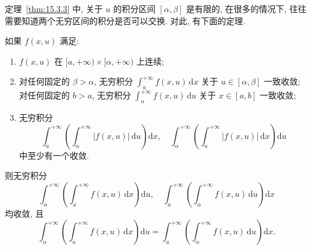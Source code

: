 定理~\ref{thm:15.3.3} 中, 关于 $u$ 的积分区间 $[\alpha,\beta]$ 是有限的, 在很多的情况下, 往往需要知道两个无穷区间的积分是否可以交换. 对此, 有下面的定理.

\begin{theorem}[无穷积分号与无穷积分号可交换]\label{thm:15.3.4}
如果 $f(x,u)$ 满足:
\begin{enumerate}
  \item $f(x,u)$ 在 $[a,+\infty)\times[\alpha,+\infty)$ 上连续;
  \item 对任何固定的 $\beta>\alpha$, 无穷积分 $\displaystyle\int_{a}^{+\infty}f(x,u)\,\mathrm{d}x$ 关于 $u\in[\alpha,\beta]$ 一致收敛; 对任何固定的 $b>a$, 无穷积分 $\displaystyle\int_{\alpha}^{+\infty}f(x,u)\,\mathrm{d}u$ 关于 $x\in[a,b]$ 一致收敛;
  \item 无穷积分
  \[
    \int_{a}^{+\infty}\left(\int_{\alpha}^{+\infty}|f(x,u)|\,\mathrm{d}u\right)\mathrm{d}x,\quad\int_{\alpha}^{+\infty}\left(\int_{a}^{+\infty}|f(x,u)|\,\mathrm{d}x\right)\mathrm{d}u
\]
  中至少有一个收敛.
\end{enumerate}
则无穷积分
\[
  \int_{\alpha}^{+\infty}\left(\int_{a}^{+\infty}f(x,u)\,\mathrm{d}x\right)\mathrm{d}u,\quad\int_{a}^{+\infty}\left(\int_{\alpha}^{+\infty}f(x,u)\,\mathrm{d}u\right)\mathrm{d}x
\]
均收敛, 且
\[
  \int_{\alpha}^{+\infty}\left(\int_{a}^{+\infty}f(x,u)\,\mathrm{d}x\right)\mathrm{d}u=\int_{a}^{+\infty}\left(\int_{\alpha}^{+\infty}f(x,u)\,\mathrm{d}u\right)\mathrm{d}x.
\]
\end{theorem}

